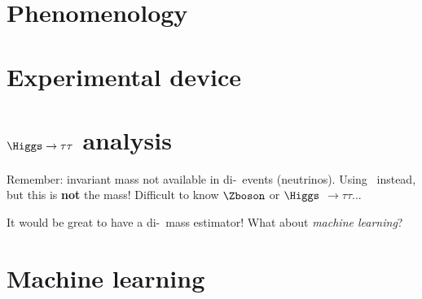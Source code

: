 \subsection*{}
\section{Phenomenology}


\subsection*{}
\section{Experimental device}

%

\subsection*{}
\section{$\Higgs\to\tau\tau$ analysis}


\begin{frame}
\manip Remember: invariant mass not available in di-\tau\ events (neutrinos).
\submanip Using \mTtot\ instead, but this is \textbf{not} the mass!
\submanip Difficult to know $\Zboson$ or $\Higgs$ $\to\tau\tau$...

\vfill

\manip It would be great to have a di-\tau\ mass estimator!
\submanip What about \emph{machine learning}?
\end{frame}

\subsection*{}
\section{Machine learning}
